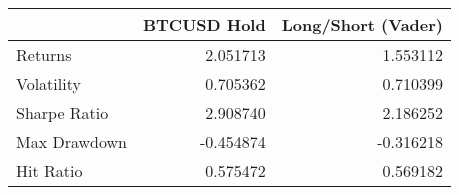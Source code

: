 \begin{tabular}{lrr}
\toprule
{} &  BTCUSD Hold &  Long/Short (Vader) \\
\midrule
Returns      &     2.051713 &            1.553112 \\
Volatility   &     0.705362 &            0.710399 \\
Sharpe Ratio &     2.908740 &            2.186252 \\
Max Drawdown &    -0.454874 &           -0.316218 \\
Hit Ratio    &     0.575472 &            0.569182 \\
\bottomrule
\end{tabular}
